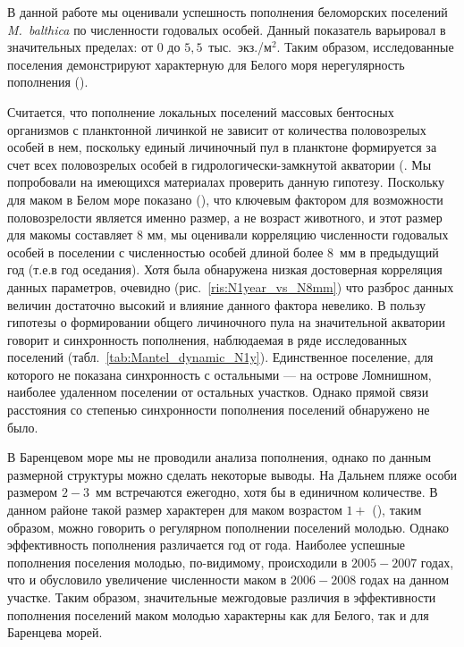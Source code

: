 \par\bigskip
В данной работе мы оценивали успешность пополнения беломорских поселений \textit{M.~balthica} по численности годовалых особей.
Данный показатель варьировал в значительных пределах: от $0$ до $5,5$~тыс.~экз./м$^2$.
Таким образом, исследованные поселения демонстрируют характерную для Белого моря нерегулярность пополнения (\cite{Maximovich_et_al_1991, Maximovich_Gerasimova_2004, Gerasimova_Maximovich_2009}).

Считается, что пополнение локальных поселений массовых бентосных организмов с планктонной личинкой не зависит от количества половозрелых особей в нем, поскольку единый личиночный пул в планктоне формируется за счет всех половозрелых особей в гидрологически-замкнутой акватории (\cite{Maximovich_Shilin_2012}.
Мы попробовали на имеющихся материалах проверить данную гипотезу.
Поскольку для маком в Белом море показано (\cite{Semenova_1980, Maximovich_1985}), что ключевым фактором для возможности половозрелости является именно размер, а не возраст животного, и этот размер для макомы составляет 8 мм, мы оценивали корреляцию численности годовалых особей в поселении с численностью особей длиной более $8$~мм в предыдущий год (т.е.в год оседания).
Хотя была обнаружена низкая достоверная корреляция данных параметров, очевидно (рис.~\ref{ris:N1year_vs_N8mm}) что разброс данных величин достаточно высокий и влияние данного фактора невелико.
В пользу гипотезы о формировании общего личиночного пула на значительной акватории говорит и синхронность пополнения, наблюдаемая в ряде исследованных поселений (табл.~\ref{tab:Mantel_dynamic_N1y}).
Единственное поселение, для которого не показана синхронность с остальными --- на острове Ломнишном, наиболее удаленном поселении от остальных участков.
Однако прямой связи расстояния со степенью синхронности пополнения поселений обнаружено не было.

В Баренцевом море мы не проводили анализа пополнения, однако по данным размерной структуры можно сделать некоторые выводы.
На Дальнем пляже особи размером $2-3$~мм встречаются ежегодно, хотя бы в единичном количестве.
В данном районе такой размер характерен для маком возрастом $1+$ (\cite{Nazarova_et_al_2010}), таким образом, можно говорить о регулярном пополнении поселений молодью. 
Однако эффективность пополнения различается год от года. 
Наиболее успешные пополнения поселения молодью, по-видимому, происходили в $2005-2007$ годах, что и обусловило увеличение численности маком в $2006-2008$ годах на данном участке.
Таким образом, значительные межгодовые различия в эффективности пополнения поселений маком молодью характерны как для Белого, так и для Баренцева морей.

